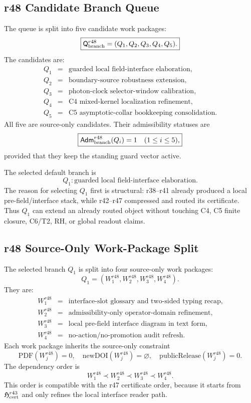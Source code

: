 \subsection{r48 Candidate Branch Queue}
\label{subsec:r48-candidate-branch-queue}

The queue is split into five candidate work packages:
\[
\boxed{
\mathsf Q_{\rm branch}^{r48}
=
(Q_1,Q_2,Q_3,Q_4,Q_5).
}
\]
The candidates are:
\[
\begin{array}{lll}
Q_1&=&\text{guarded local field-interface elaboration},\\
Q_2&=&\text{boundary-source robustness extension},\\
Q_3&=&\text{photon-clock selector-window calibration},\\
Q_4&=&\text{C4 mixed-kernel localization refinement},\\
Q_5&=&\text{C5 asymptotic-collar bookkeeping consolidation}.
\end{array}
\]
All five are source-only candidates.  Their admissibility statuses are
\[
\boxed{
\mathsf{Adm}_{\rm branch}^{r48}(Q_i)=1
\quad(1\leq i\leq5),
}
\]
provided that they keep the standing guard vector active.

The selected default branch is
\[
\boxed{
Q_1:
\text{guarded local field-interface elaboration}.
}
\]
The reason for selecting \(Q_1\) first is structural: r38--r41 already produced
a local pre-field/interface stack, while r42--r47 compressed and routed its
certificate.  Thus \(Q_1\) can extend an already routed object without touching
C4, C5 finite closure, C6/T2, RH, or global readout claims.

\subsection{r48 Source-Only Work-Package Split}
\label{subsec:r48-source-only-work-package-split}

The selected branch \(Q_1\) is split into four source-only work packages:
\[
\boxed{
Q_1=(W_1^{r48},W_2^{r48},W_3^{r48},W_4^{r48}).
}
\]
They are:
\[
\begin{array}{lll}
W_1^{r48}&=&\text{interface-slot glossary and two-sided typing recap},\\
W_2^{r48}&=&\text{admissibility-only operator-domain refinement},\\
W_3^{r48}&=&\text{local pre-field interface diagram in text form},\\
W_4^{r48}&=&\text{no-action/no-promotion audit refresh}.
\end{array}
\]
Each work package inherits the source-only constraint
\[
\boxed{
\mathrm{PDF}(W_j^{r48})=0,
\quad
\mathrm{newDOI}(W_j^{r48})=\varnothing,
\quad
\mathrm{publicRelease}(W_j^{r48})=0.
}
\]
The dependency order is
\[
\boxed{
W_1^{r48}\prec W_2^{r48}\prec W_3^{r48}\prec W_4^{r48}.
}
\]
This order is compatible with the r47 certificate order, because it starts from
\(\mathfrak H_{\rm cert}^{r43}\) and only refines the local interface reader
path.


